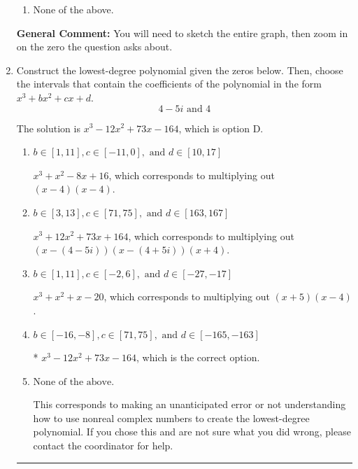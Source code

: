 \documentclass{extbook}[14pt]
\newcommand{\litem}[1]{\item #1

\rule{\textwidth}{0.4pt}}
\begin{document}
\begin{enumerate}
{\begin{enumerate}[label=\Alph*.]
\item None of the above.\end{enumerate}
\textbf{General Comment:} You will need to sketch the entire graph, then zoom in on the zero the question asks about.
}
\litem{
Construct the lowest-degree polynomial given the zeros below. Then, choose the intervals that contain the coefficients of the polynomial in the form $x^3+bx^2+cx+d$.
\[ 4 - 5 i \text{ and } 4 \]

The solution is \( x^{3} -12 x^{2} +73 x -164 \), which is option D.\begin{enumerate}[label=\Alph*.]
\item \( b \in [1, 11], c \in [-11, 0], \text{ and } d \in [10, 17] \)

$x^{3} + x^{2} -8 x + 16$, which corresponds to multiplying out $(x -4)(x -4)$.
\item \( b \in [3, 13], c \in [71, 75], \text{ and } d \in [163, 167] \)

$x^{3} +12 x^{2} +73 x + 164$, which corresponds to multiplying out $(x-(4 - 5 i))(x-(4 + 5 i))(x + 4)$.
\item \( b \in [1, 11], c \in [-2, 6], \text{ and } d \in [-27, -17] \)

$x^{3} + x^{2} +x -20$, which corresponds to multiplying out $(x + 5)(x -4)$.
\item \( b \in [-16, -8], c \in [71, 75], \text{ and } d \in [-165, -163] \)

* $x^{3} -12 x^{2} +73 x -164$, which is the correct option.
\item \( \text{None of the above.} \)

This corresponds to making an unanticipated error or not understanding how to use nonreal complex numbers to create the lowest-degree polynomial. If you chose this and are not sure what you did wrong, please contact the coordinator for help.
\end{enumerate}

}
\end{enumerate}
\end{document}

